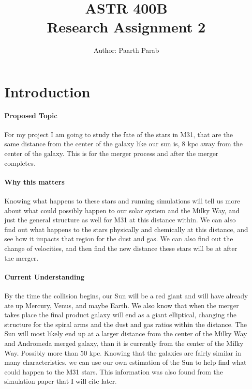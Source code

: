 \documentclass{report}
\title{\Huge{ASTR 400B}\\Research Assignment 2}
\author{\huge{Author: Paarth Parab}}
\date{}
\begin{document}
\maketitle
\newpage%

\pagebreak
\section*{Introduction}

\paragraph{Proposed Topic}
\paragraph{}
For my project I am going to study the fate of the stars in M31, that
are the same distance from the center of the galaxy like our sun is, 8 kpc away from the center of the galaxy. This is for the merger process and after the merger completes. 

\paragraph{Why this matters}
\paragraph{}
Knowing what happens to these stars and running simulations will tell us more about what could possibly happen to our solar system and the Milky Way, and just the general structure as well for M31 at this distance within. We can also find out what happens to the stars physically and chemically at this distance, and see how it impacts that region for the dust and gas. We can also find out the change of velocities, and then find the new distance these stars will be at after the merger.

\paragraph{Current Understanding}
\paragraph{}
By the time the collision begins, our Sun will be a red giant and will have already ate up Mercury, Venus, and maybe Earth. We also know that when the merger takes place the final product galaxy will end as a giant elliptical, changing the structure for the spiral arms and the dust and gas ratios within the distance. The Sun will most likely end up at a larger distance from the center of the Milky Way and Andromeda merged galaxy, than it is currently from the center of the Milky Way. Possibly more than 50 kpc.
Knowing that the galaxies are fairly similar in many characteristics, we can use our own estimation of the Sun to help find what could happen to the M31 stars. 
This information was also found from the simulation paper that I will cite later.
\end{document}
